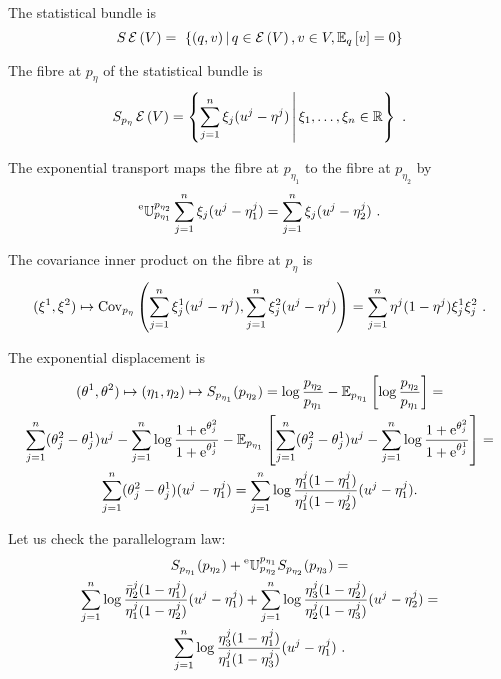 \documentclass[12pt,a4paper]{amsart}
\theoremstyle{remark}
\begin{document}
The statistical bundle is
\begin{equation}
  \label{eq:66}
  S\operatorname{\mathcal E}\left(V\right) = \
  \left\{(q,v) \, \middle| \, q \in \operatorname{\mathcal E}\left(V\right), v \in V, \operatorname{\mathbb E}_{q}\left[v\right] = 0 \right\}
\end{equation}

The fibre at $p_\eta$ of the statistical bundle is
\begin{equation}
  \label{eq:28}
  S_{p_\eta}\operatorname{\mathcal E}\left(V\right) = \left\{\sum_{j=1}^n \xi_j(u^j - \eta^j) \, \middle| \, \xi_1,\dots,\xi_n \in \mathbb{R} \right\} \ .
\end{equation}

The exponential transport maps the fibre at $p_{\eta_1}$ to the fibre at $p_{\eta_2}$ by
\begin{equation}
  \label{eq:49}
  \prescript{\text{e}}{} {\mathbb U} _ {p_{\eta_1}} ^ {p_{\eta_2}} \sum_{j=1}^n \xi_j(u^j - \eta^j_1) = \sum_{j=1}^n \xi_j(u^j - \eta^j_2) \ .
\end{equation}

The covariance inner product on the fibre at $p_\eta$ is
\begin{equation}
  \label{eq:29}
(\xi^1,\xi^2) \mapsto  \operatorname{Cov}_{p_\eta}\left(\sum_{j=1}^n \xi_j^1 (u^j - \eta^j),\sum_{j=1}^n  \xi_j^2(u^j-\eta^j)\right) = \sum_{j=1}^n \eta^j(1-\eta^j) \xi_j^1 \xi_j^2 \ .
\end{equation}

The exponential displacement is
\begin{multline}
  \label{eq:30}
  (\theta^1,\theta^2) \mapsto (\eta_1,\eta_2) \mapsto
  S_{p_{\eta_1}}(p_{\eta_2}) = \log \frac {p_{\eta_2}}{p_{\eta_1}} - \operatorname{\mathbb E}_{p_{\eta_1}}\left[\log \frac {p_{\eta_2}}{p_{\eta_1}}\right] = \\
  \sum_{j=1}^n (\theta^2_j - \theta_j^1) u^j - \sum_{j=1}^n \log \frac {1 + \mathrm{e}^{\theta_j^2}}{1 + \mathrm{e}^{\theta_j^1}} - \operatorname{\mathbb E}_{p_{\eta_1}}\left[ \sum_{j=1}^n (\theta_j^2 - \theta_j^1) u^j - \sum_{j=1}^n \log \frac {1 + \mathrm{e}^{\theta_j^2}}{1 + \mathrm{e}^{\theta_j^1}}\right] = \\
  \sum_{j=1}^n (\theta_j^2 - \theta_j^1)(u^j - \eta^j_1) = \sum_{j=1}^n \log \frac {\eta^j_1(1 - \eta^j_1)}{\eta^j_1 (1-\eta^j_2)} (u^j - \eta^j_1) .
\end{multline}

Let us check the parallelogram law:
\begin{multline}
  \label{eq:31}
  S_{p_{\eta_1}}(p_{\eta_2}) + \prescript{\text{e}}{} {\mathbb U} _ {p_{\eta_2}} ^ {p_{\eta_1}} S_{p_{\eta_2}}(p_{\eta_3}) = \\ 
  \sum_{j=1}^n \log \frac {\bar \eta^j_2(1 - \eta^j_1)}{\eta^j_1 (1- \eta^j_2)} (u^j - \eta^j_1) + \sum_{j=1}^n \log \frac {\eta_3^j(1 - \eta_2^j)}{\eta^j_2 (1- \eta_3^j)} (u^j - \eta^j_2) = \\
  \sum_{j=1}^n \log \frac {\eta^j_3(1 - \eta^j_1)}{\eta^j_1 (1- \eta_3^j)} (u^j - \eta^j_1) \ .
\end{multline}
\end{document}
